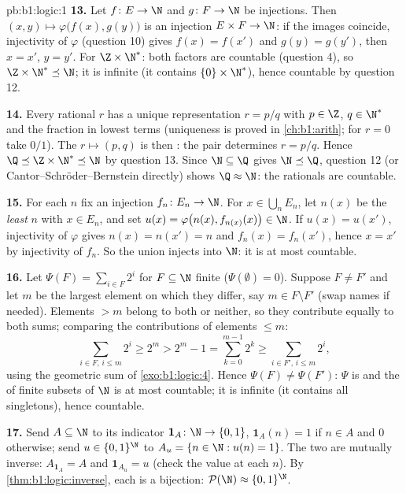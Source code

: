 \begin{solution}{pb:b1:logic:1}
\textbf{13.} Let $f \colon E \to \N$ and $g \colon F \to \N$ be
injections. Then $(x, y) \mapsto \varphi\bigl(f(x), g(y)\bigr)$ is an
injection $E \times F \to \N$: if the images coincide, injectivity of
$\varphi$ (question 10) gives $f(x) = f(x')$ and $g(y) = g(y')$,
then $x = x'$, $y = y'$. For $\Z \times \N^*$: both factors are
countable (question 4), so $\Z \times \N^* \preceq \N$; it is
infinite (it contains $\{0\} \times \N^*$), hence countable by
question 12.

\textbf{14.} Every rational $r$ has a unique representation $r =
p/q$ with $p \in \Z$, $q \in \N^*$ and the fraction in lowest terms
(uniqueness is proved in \cref{ch:b1:arith}; for $r = 0$ take
$0/1$). The  $r \mapsto (p, q)$ is then : the pair
determines $r = p/q$. Hence $\Q \preceq \Z \times \N^* \preceq \N$
by question 13. Since $\N \subseteq \Q$ gives $\N \preceq \Q$,
question 12 (or Cantor--Schr\"oder--Bernstein directly) shows $\Q
\approx \N$: the rationals are countable.

\textbf{15.} For each $n$ fix an injection $f_n \colon E_n \to \N$.
For $x \in \bigcup_n E_n$, let $n(x)$ be the \emph{least} $n$ with
$x \in E_n$, and set $u(x) = \varphi\bigl(n(x), f_{n(x)}(x)\bigr)
\in \N$. If $u(x) = u(x')$, injectivity of $\varphi$ gives $n(x) =
n(x') = n$ and $f_n(x) = f_n(x')$, hence $x = x'$ by injectivity of
$f_n$. So the union injects into $\N$: it is at most countable.

\textbf{16.} Let $\Psi(F) = \sum_{i \in F} 2^i$ for $F \subseteq \N$
finite ($\Psi(\emptyset) = 0$). Suppose $F \neq F'$ and let $m$ be
the largest element on which they differ, say $m \in F \setminus
F'$ (swap names if needed). Elements $> m$ belong to both or
neither, so they contribute equally to both sums; comparing the
contributions of elements $\leq m$:
\[
\sum_{i \in F,\, i \leq m} 2^i \geq 2^m
> 2^m - 1 = \sum_{k=0}^{m-1} 2^k
\geq \sum_{i \in F',\, i \leq m} 2^i ,
\]
using the geometric sum of \cref{exo:b1:logic:4}. Hence $\Psi(F)
\neq \Psi(F')$: $\Psi$ is  and the  of finite subsets
of $\N$ is at most countable; it is infinite (it contains all
singletons), hence countable.

\textbf{17.} Send $A \subseteq \N$ to its indicator $\mathbf 1_A
\colon \N \to \{0,1\}$, $\mathbf 1_A(n) = 1$ if $n \in A$ and $0$
otherwise; send $u \in \{0,1\}^{\N}$ to $A_u = \{n \in \N : u(n) =
1\}$. The two  are mutually inverse: $A_{\mathbf 1_A} = A$ and
$\mathbf 1_{A_u} = u$ (check the value at each $n$). By
\cref{thm:b1:logic:inverse}, each is a bijection: $\mathcal{P}(\N)
\approx \{0,1\}^{\N}$.


\end{solution}
